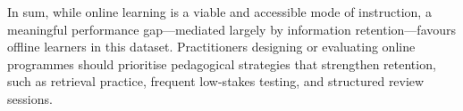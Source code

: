\documentclass[11pt]{article}
\begin{document}
In sum, while online learning is a viable and accessible mode of instruction,
a meaningful performance gap---mediated largely by information retention---favours
offline learners in this dataset.
Practitioners designing or evaluating online programmes should prioritise
pedagogical strategies that strengthen retention, such as retrieval practice,
frequent low-stakes testing, and structured review sessions.
\end{document}
